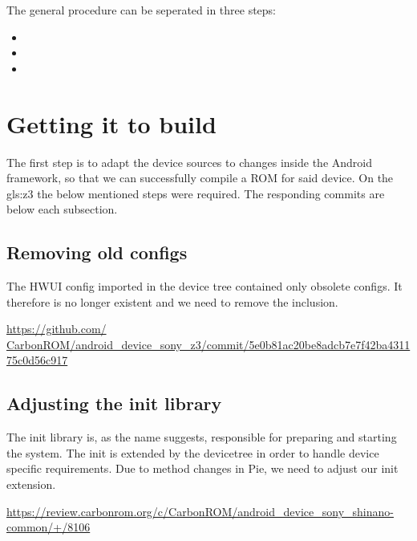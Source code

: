 
The general procedure can be seperated in three steps:
\begin{itemize}
	\item{}
	\item{}
	\item{}
\end{itemize}

\section{Getting it to build}
\label{ch:GettingItToBuild}

The first step is to adapt the device sources to changes inside the Android framework, so that we can successfully compile a ROM for said device.
On the \gls{gls:z3} the below mentioned steps were required. The responding commits are below each subsection.

\subsection{Removing old configs}

The HWUI config imported in the device tree contained only obsolete configs. It therefore is no longer existent and we need to remove the inclusion.

\href{https://github.com/CarbonROM/android_device_sony_z3/commit/5e0b81ac20be8adcb7e7f42ba431175c0d56c917}{https://github.com/\\CarbonROM/android\_device\_sony\_z3/commit/5e0b81ac20be8adcb7e7f42ba431175c0d56c917}

\subsection{Adjusting the init library}
The init library is, as the name suggests, responsible for preparing and starting the system.
The init is extended by the devicetree in order to handle device specific requirements.
Due to method changes in Pie, we need to adjust our init extension.

\url{https://review.carbonrom.org/c/CarbonROM/android_device_sony_shinano-common/+/8106}

